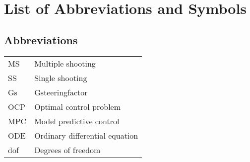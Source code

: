 \documentclass[master=wtk,english]{kulemt}
\begin{document}
\listoffiguresandtables
\chapter{List of Abbreviations and Symbols}
\section*{Abbreviations}
\begin{flushleft}
  \renewcommand{\arraystretch}{1.1}
  \begin{tabularx}{\textwidth}{@{}p{12mm}X@{}}
    MS   & Multiple shooting  \\
    SS   & Single shooting  \\
    Gs   & Gsteeringfactor  \\
    OCP  & Optimal control problem\\
    MPC  & Model predictive control\\
    ODE  & Ordinary differential equation\\
    dof  & Degrees of freedom
  \end{tabularx}
\end{flushleft}
\end{document}
